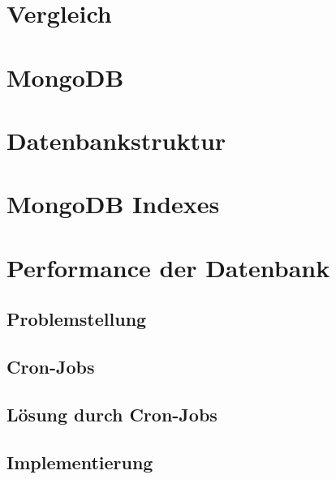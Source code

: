 \section{Vergleich}


\section{MongoDB}


\section{Datenbankstruktur}


\section{MongoDB Indexes}


\section{Performance der Datenbank}


\subsection{Problemstellung}


\subsection{Cron-Jobs}


\subsection{Lösung durch Cron-Jobs}


\subsection{Implementierung}
